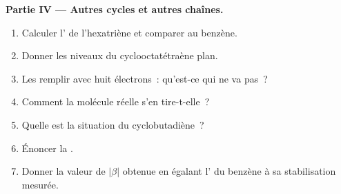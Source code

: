 \begin{problem}
\medskip
\noindent\textbf{Partie IV --- Autres cycles et autres chaînes.}
\begin{enumerate}[resume]
  \item Calculer l' de l'hexatriène et comparer au benzène.
  \item Donner les niveaux du cyclooctatétraène plan.
  \item Les remplir avec huit électrons~: qu'est-ce qui ne va pas~?
  \item Comment la molécule réelle s'en tire-t-elle~?
  \item Quelle est la situation du cyclobutadiène~?
  \item Énoncer la .
  \item Donner la valeur de $|\beta|$ obtenue en égalant l' du benzène
        à sa stabilisation mesurée.
\end{enumerate}
\end{problem}
